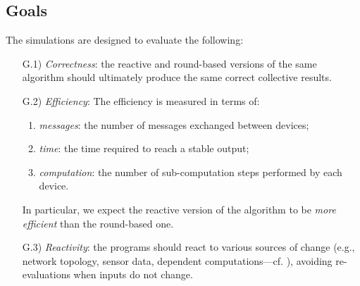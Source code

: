 \subsection{Goals}\label{acsos2023-frp:eval:goals}
%
The simulations are designed to evaluate the following:
%
\begin{enumerate}
\item[G.1)] \emph{Correctness}: the reactive and round-based versions of the same algorithm should ultimately produce the same correct collective results.
\item[G.2)] \emph{Efficiency}: The efficiency is measured in terms of:
\begin{enumerate}
  \item \emph{messages}: the number of messages exchanged between devices;
  \item \emph{time}: the time required to reach a stable output;
  \item \emph{computation}: the number of sub-computation steps performed by each device.
\end{enumerate}
In particular, we expect the reactive version of the algorithm to be \emph{more efficient} than the round-based one.
\item[G.3)] \emph{Reactivity}: the programs should react to various sources of change
 (e.g., network topology, sensor data, dependent computations---cf. ),
  avoiding re-evaluations when inputs do not change.
\end{enumerate}

